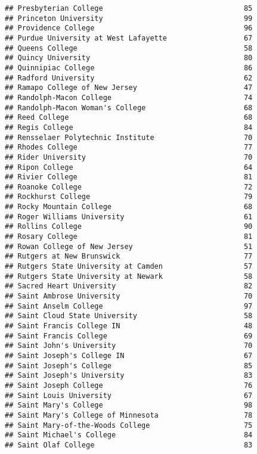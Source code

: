 \documentclass[
]{article}
\begin{document}
\begin{verbatim}
## Presbyterian College                                 85
## Princeton University                                 99
## Providence College                                   96
## Purdue University at West Lafayette                  67
## Queens College                                       58
## Quincy University                                    80
## Quinnipiac College                                   86
## Radford University                                   62
## Ramapo College of New Jersey                         47
## Randolph-Macon College                               74
## Randolph-Macon Woman's College                       68
## Reed College                                         68
## Regis College                                        84
## Rensselaer Polytechnic Institute                     70
## Rhodes College                                       77
## Rider University                                     70
## Ripon College                                        64
## Rivier College                                       81
## Roanoke College                                      72
## Rockhurst College                                    79
## Rocky Mountain College                               68
## Roger Williams University                            61
## Rollins College                                      90
## Rosary College                                       81
## Rowan College of New Jersey                          51
## Rutgers at New Brunswick                             77
## Rutgers State University at Camden                   57
## Rutgers State University at Newark                   58
## Sacred Heart University                              82
## Saint Ambrose University                             70
## Saint Anselm College                                 97
## Saint Cloud State University                         58
## Saint Francis College IN                             48
## Saint Francis College                                69
## Saint John's University                              70
## Saint Joseph's College IN                            67
## Saint Joseph's College                               85
## Saint Joseph's University                            83
## Saint Joseph College                                 76
## Saint Louis University                               67
## Saint Mary's College                                 98
## Saint Mary's College of Minnesota                    78
## Saint Mary-of-the-Woods College                      75
## Saint Michael's College                              84
## Saint Olaf College                                   83

\end{verbatim}
\end{document}

